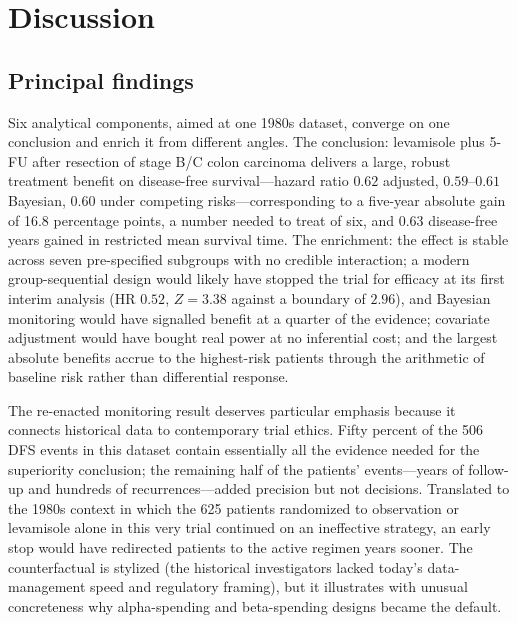 \section{Discussion}\label{sec:discussion}

\subsection{Principal findings}

Six analytical components, aimed at one 1980s dataset, converge on one
conclusion and enrich it from different angles. The conclusion:
levamisole plus 5-FU after resection of stage B/C colon carcinoma
delivers a large, robust treatment benefit on disease-free
survival---hazard ratio $0.62$ adjusted, $0.59$--$0.61$ Bayesian, $0.60$
under competing risks---corresponding to a five-year absolute gain of
16.8 percentage points, a number needed to treat of six, and 0.63
disease-free years gained in restricted mean survival time. The
enrichment: the effect is stable across seven pre-specified subgroups
with no credible interaction; a modern group-sequential design would
likely have stopped the trial for efficacy at its first interim analysis
(HR $0.52$, $Z = 3.38$ against a boundary of $2.96$), and Bayesian
monitoring would have signalled benefit at a quarter of the evidence;
covariate adjustment would have bought real power at no inferential
cost; and the largest absolute benefits accrue to the highest-risk
patients through the arithmetic of baseline risk rather than
differential response.

The re-enacted monitoring result deserves particular emphasis because it
connects historical data to contemporary trial ethics. Fifty percent of
the 506 DFS events in this dataset contain essentially all the evidence
needed for the superiority conclusion; the remaining half of the
patients' events---years of follow-up and hundreds of
recurrences---added precision but not decisions. Translated to the 1980s
context in which the 625 patients randomized to observation or
levamisole alone in this very trial continued on an ineffective
strategy, an early stop would have redirected patients to the active
regimen years sooner. The counterfactual is stylized (the historical
investigators lacked today's data-management speed and regulatory
framing), but it illustrates with unusual concreteness why alpha-spending
and beta-spending designs became the default.


